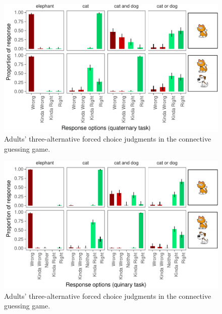 \documentclass[floatsintext,man]{apa6}
\theoremstyle{definition}
\theoremstyle{definition}
\theoremstyle{definition}
\theoremstyle{remark}
\begin{document}
\begin{figure}[t]

{\centering \includegraphics{writeup_files/figure-latex/quaternaryPlot-1} 

}

\caption{Adults' three-alternative forced choice judgments in the connective guessing game.}\label{fig:quaternaryPlot}
\end{figure}

\begin{figure}[t]

{\centering \includegraphics{writeup_files/figure-latex/quinaryPlot-1} 

}

\caption{Adults' three-alternative forced choice judgments in the connective guessing game.}\label{fig:quinaryPlot}
\end{figure}
\end{document}
